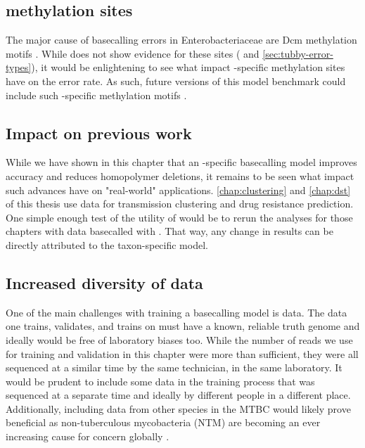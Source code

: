 \subsection{\mtb{} methylation sites}
The major cause of \guppy{} basecalling errors in Enterobacteriaceae are Dcm methylation motifs \cite{wick2019}. While \mtb{} does not show evidence for these sites (\cite{Danjuma2017} and \autoref{sec:tubby-error-types}), it would be enlightening to see what impact \mtb{}-specific methylation sites have on the error rate. As such, future versions of this model benchmark could include such \mtb{}-specific methylation motifs \cite{chiner2019,modlin2020}.

\subsection{Impact on previous work}
While we have shown in this chapter that an \mtb{}-specific basecalling model improves accuracy and reduces homopolymer deletions, it remains to be seen what impact such advances have on "real-world" applications. \autoref{chap:clustering} and \autoref{chap:dst} of this thesis use \ont{} data for \mtb{} transmission clustering and drug resistance prediction. One simple enough test of the utility of \tubby{} would be to rerun the analyses for those chapters with \ont{} data basecalled with \tubby{}. That way, any change in results can be directly attributed to the taxon-specific model.

\subsection{Increased diversity of data}
One of the main challenges with training a basecalling model is data. The data one trains, validates, and trains on must have a known, reliable truth genome and ideally would be free of laboratory biases too. While the number of reads we use for training and validation in this chapter were more than sufficient, they were all sequenced at a similar time by the same technician, in the same laboratory. It would be prudent to include some data in the training process that was sequenced at a separate time and ideally by different people in a different place. Additionally, including data from other species in the MTBC would likely prove beneficial as non-tuberculous mycobacteria (NTM) are becoming an ever increasing cause for concern globally \cite{Johansen2020}.

